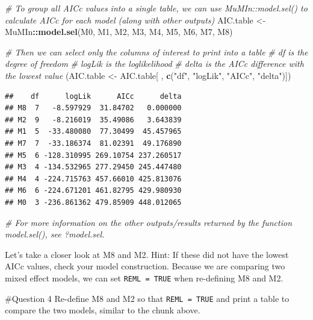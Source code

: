 \documentclass[
]{article}
\newenvironment{Shaded}{\begin{snugshade}}{\end{snugshade}}
\newcommand{\CommentTok}[1]{\textcolor[rgb]{0.56,0.35,0.01}{\textit{#1}}}
\newcommand{\FunctionTok}[1]{\textcolor[rgb]{0.13,0.29,0.53}{\textbf{#1}}}
\newcommand{\NormalTok}[1]{#1}
\newcommand{\OtherTok}[1]{\textcolor[rgb]{0.56,0.35,0.01}{#1}}
\newcommand{\SpecialCharTok}[1]{\textcolor[rgb]{0.81,0.36,0.00}{\textbf{#1}}}
\newcommand{\StringTok}[1]{\textcolor[rgb]{0.31,0.60,0.02}{#1}}
\begin{document}
\begin{Shaded}
\begin{Highlighting}[]
\CommentTok{\# To group all AICc values into a single table, we can use MuMIn::model.sel() to calculate AICc for each model (along with other outputs)}
\NormalTok{AIC.table  }\OtherTok{\textless{}{-}}\NormalTok{ MuMIn}\SpecialCharTok{::}\FunctionTok{model.sel}\NormalTok{(M0, M1, M2, M3, M4, M5, M6, M7, M8)}

\CommentTok{\# Then we can select only the columns of interest to print into a table }
\CommentTok{\# \textasciigrave{}df\textasciigrave{} is the degree of freedom}
\CommentTok{\# \textasciigrave{}logLik\textasciigrave{} is the loglikelihood}
\CommentTok{\# \textasciigrave{}delta\textasciigrave{} is the AICc difference with the lowest value}
\NormalTok{(AIC.table }\OtherTok{\textless{}{-}}\NormalTok{ AIC.table[ , }\FunctionTok{c}\NormalTok{(}\StringTok{"df"}\NormalTok{, }\StringTok{"logLik"}\NormalTok{, }\StringTok{"AICc"}\NormalTok{, }\StringTok{"delta"}\NormalTok{)])}
\end{Highlighting}
\end{Shaded}

\begin{verbatim}
##    df      logLik      AICc      delta
## M8  7   -8.597929  31.84702   0.000000
## M2  9   -8.216019  35.49086   3.643839
## M1  5  -33.480080  77.30499  45.457965
## M7  7  -33.186374  81.02391  49.176890
## M5  6 -128.310995 269.10754 237.260517
## M3  4 -134.532965 277.29450 245.447480
## M4  4 -224.715763 457.66010 425.813076
## M6  6 -224.671201 461.82795 429.980930
## M0  3 -236.861362 479.85909 448.012065
\end{verbatim}

\begin{Shaded}
\begin{Highlighting}[]
\CommentTok{\# For more information on the other outputs/results returned by the function \textasciigrave{}model.sel()\textasciigrave{}, see \textasciigrave{}?model.sel\textasciigrave{}.}
\end{Highlighting}
\end{Shaded}

Let's take a closer look at M8 and M2. Hint: If these did not have the
lowest AICc values, check your model construction. Because we are
comparing two mixed effect models, we can set \texttt{REML\ =\ TRUE}
when re-defining M8 and M2.

\#Question 4 Re-define M8 and M2 so that \texttt{REML\ =\ TRUE} and
print a table to compare the two models, similar to the chunk above.
\end{document}
